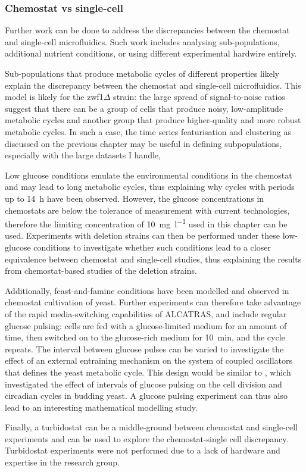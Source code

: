 \subsubsection{Chemostat vs single-cell}
\label{subsec:biology-discussion-caveats-chemostat}

Further work can be done to address the discrepancies between the chemostat and single-cell microfluidics.
Such work includes analysing sub-populations, additional nutrient conditions, or using different experimental hardwire entirely.

Sub-populations that produce metabolic cycles of different properties likely explain the discrepancy between the chemostat and single-cell microfluidics.
This model is likely for the zwf1$\Delta$ strain: the large spread of signal-to-noise ratios suggest that there can be a group of cells that produce noisy, low-amplitude metabolic cycles and another group that produce higher-quality and more robust metabolic cycles.
In such a case, the time series featurisation and clustering as discussed on the previous chapter may be useful in defining subpopulations, especially with the large datasets I handle,

Low glucose conditions emulate the environmental conditions in the chemostat and may lead to long metabolic cycles, thus explaining why cycles with periods up to \SI{14}{\hour} have been observed.
However, the glucose concentrations in chemostats are below the tolerance of measurement with current technologies, therefore the limiting concentration of \SI{10}{\milli\gram~\litre^{-1}} used in this chapter can be used.
Experiments with deletion strains can then be performed under these low-glucose conditions to investigate whether such conditions lead to a closer equivalence between chemostat and single-cell studies, thus explaining the results from chemostat-based studies of the deletion strains.

Additionally, feast-and-famine conditions have been modelled \parencite{jonesCyberneticModelGrowth1999} and observed \parencite{oneillEukaryoticCellBiology2020} in chemostat cultivation of yeast.
Further experiments can therefore take advantage of the rapid media-switching capabilities of ALCATRAS, and include regular glucose pulsing: cells are fed with a glucose-limited medium for an amount of time, then switched on to the glucose-rich medium for \SI{10}{\minute}, and the cycle repeats.
The interval between glucose pulses can be varied to investigate the effect of an external entraining mechanism on the system of coupled oscillators that defines the yeast metabolic cycle.
This design would be similar to \textcite{charvinForcedPeriodicExpression2009}, which investigated the effect of intervals of glucose pulsing on the cell division and circadian cycles in budding yeast.
A glucose pulsing experiment can thus also lead to an interesting mathematical modelling study.

Finally, a turbidostat can be a middle-ground between chemostat and single-cell experiments and can be used to explore the chemostat-single cell discrepancy.
Turbidostat experiments were not performed due to a lack of hardware and expertise in the research group.
